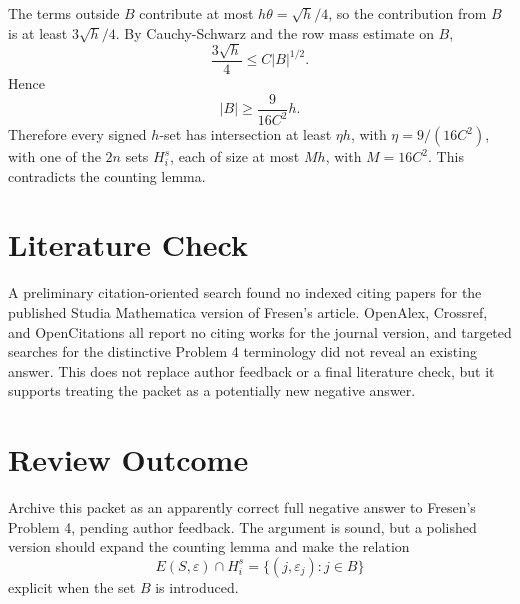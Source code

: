 \documentclass[11pt]{article}
\begin{document}
The terms outside \(B\) contribute at most \(h\theta=\sqrt h/4\), so the
contribution from \(B\) is at least \(3\sqrt h/4\).  By Cauchy-Schwarz and
the row mass estimate on \(B\),
\[
  \frac{3\sqrt h}{4}
  \leq
  C |B|^{1/2}.
\]
Hence
\[
  |B|\geq \frac{9}{16C^2}h.
\]
Therefore every signed \(h\)-set has intersection at least
\(\eta h\), with \(\eta=9/(16C^2)\), with one of the \(2n\) sets \(H_i^s\),
each of size at most \(Mh\), with \(M=16C^2\).  This contradicts the counting
lemma.

\section*{Literature Check}

A preliminary citation-oriented search found no indexed citing papers for the
published Studia Mathematica version of Fresen's article.  OpenAlex, Crossref,
and OpenCitations all report no citing works for the journal version, and
targeted searches for the distinctive Problem 4 terminology did not reveal an
existing answer.  This does not replace author feedback or a final literature
check, but it supports treating the packet as a potentially new negative
answer.

\section*{Review Outcome}

Archive this packet as an apparently correct full negative answer to Fresen's
Problem 4, pending author feedback.  The argument is sound, but a polished
version should expand the counting lemma and make the relation
\[
  E(S,\varepsilon)\cap H_i^s
  =
  \{(j,\varepsilon_j):j\in B\}
\]
explicit when the set \(B\) is introduced.
\end{document}

